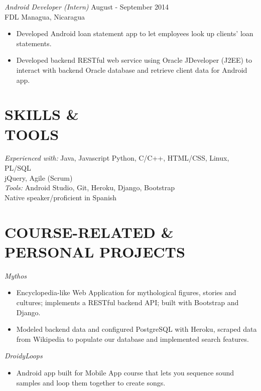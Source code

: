 \documentclass[line,margin]{res}
\begin{document}
\begin{resume}
    {\sl Android Developer (Intern) } \hfill August - September 2014 \\
    { FDL } \hfill Managua, Nicaragua \\
     \begin{itemize} \itemsep -2pt %
        \item \small Developed Android loan statement app to let employees look up clients' loan statements.
        \item \small Developed backend RESTful web service using Oracle JDeveloper (J2EE) to interact with backend Oracle database and retrieve client data for Android app.
    \end{itemize}

\section{SKILLS \&\\ TOOLS} \small {\sl Experienced with:} Java, Javascript Python, C/C++, HTML/CSS, Linux, PL/SQL \\
                jQuery, Agile (Scrum) \\
                \small {\sl Tools:} Android Studio, Git, Heroku, Django, Bootstrap
                \\\small Native speaker/proficient in Spanish

\section{COURSE-RELATED \& PERSONAL PROJECTS}
    {\sl Mythos}
    \begin{itemize} \itemsep -2pt %
    \item \small Encyclopedia-like Web Application for mythological figures, stories and cultures; implements a RESTful backend API; built with Bootstrap and Django.
    \item \small Modeled backend data and configured PostgreSQL with Heroku, scraped data from Wikipedia to populate our database and implemented search features.
    \end{itemize}

    {\sl DroidyLoops}
    \begin{itemize} \itemsep -2pt
    \item \small Android app built for Mobile App course that lets you sequence sound samples and loop them together to create songs.
    \end{itemize}

\end{resume}
\end{document}
